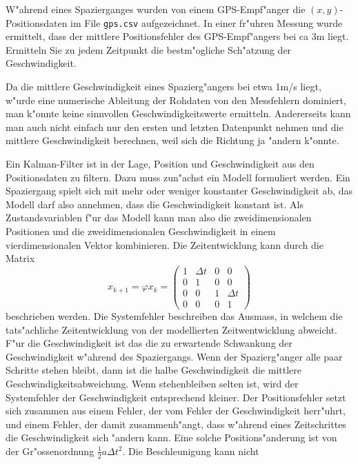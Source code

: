 W"ahrend eines Spazierganges wurden von einem GPS-Empf"anger die
$(x,y)$-Positionsdaten im File \texttt{gps.csv} aufgezeichnet.
In einer fr"uhren Messung wurde ermittelt, dass der mittlere Positionsfehler
des GPS-Empf"angers bei ca 3m liegt.
Ermitteln Sie zu jedem Zeitpunkt die bestm"ogliche Sch"atzung 
der Geschwindigkeit.

\begin{loesung}
Da die mittlere Geschwindigkeit eines Spazierg"angers bei etwa 1m/s liegt,
w"urde eine numerische Ableitung der Rohdaten von den Messfehlern dominiert,
man k"onnte keine sinnvollen Geschwindigkeitswerte ermitteln.
Andererseits kann man auch nicht einfach nur den ersten und letzten
Datenpunkt nehmen und die mittlere Geschwindigkeit berechnen, weil
sich die Richtung ja "andern k"onnte.

Ein Kalman-Filter ist in der Lage, Position und Geschwindigkeit aus
den Positionsdaten zu filtern. Dazu muss zun"achst ein Modell formuliert
werden. Ein Spaziergang spielt sich mit mehr oder weniger konstanter
Geschwindigkeit ab, das Modell darf also annehmen, dass die Geschwindigkeit
konstant ist. Als Zustandsvariablen f"ur das Modell kann man also die
zweidimensionalen Positionen und die zweidimensionalen Geschwindigkeit
in einem vierdimensionalen Vektor kombinieren.
Die Zeitentwicklung kann durch die Matrix
\begin{equation}
x_{k+1}=\varphi x_k=
\begin{pmatrix}
1&\Delta t & 0 & 0       \\
0&    1    & 0 & 0       \\
0&    0    & 1 & \Delta t\\
0&    0    & 0 & 1
\end{pmatrix}
\end{equation}
beschrieben werden. Die Systemfehler beschreiben das Ausmass, in
welchem die tats"achliche Zeitentwicklung von der modellierten
Zeitwentwicklung abweicht.
F"ur die Geschwindigkeit ist das die zu erwartende Schwankung der
Geschwindigkeit w"ahrend des Spaziergangs. Wenn der Spazierg"anger
alle paar Schritte stehen bleibt, dann ist die halbe Geschwindigkeit
die mittlere Geschwindigkeitsabweichung. Wenn stehenbleiben selten
ist, wird der Systemfehler der Geschwindigkeit entsprechend kleiner.
Der Positionsfehler setzt sich zusammen aus einem Fehler, der vom
Fehler der Geschwindigkeit herr"uhrt, und einem Fehler, der damit
zusammenh"angt, dass w"ahrend eines Zeitschrittes die Geschwindigkeit
sich "andern kann. Eine solche Positions"anderung ist von
der Gr"ossenordnung $\frac12a\Delta t^2$. Die Beschleunigung kann nicht

\end{loesung}
